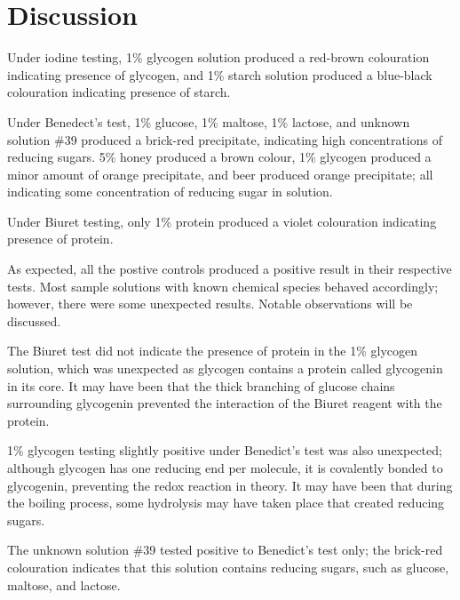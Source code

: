 \section*{Discussion}

Under iodine testing, 1\% glycogen solution produced a red-brown colouration indicating presence of glycogen, and 1\% starch solution produced a blue-black colouration indicating presence of starch.

Under Benedect's test, 1\% glucose, 1\% maltose, 1\% lactose, and unknown solution \#39 produced a brick-red precipitate, indicating high concentrations of reducing sugars. 5\% honey produced a brown colour, 1\% glycogen produced a minor amount of orange precipitate, and beer produced orange precipitate; all indicating some concentration of reducing sugar in solution.

Under Biuret testing, only 1\% protein produced a violet colouration indicating presence of protein.

As expected, all the postive controls produced a positive result in their respective tests. Most sample solutions with known chemical species behaved accordingly; however, there were some unexpected results. Notable observations will be discussed.

The Biuret test did not indicate the presence of protein in the 1\% glycogen solution, which was unexpected as glycogen contains a protein called glycogenin in its core. It may have been that the thick branching of glucose chains surrounding glycogenin prevented the interaction of the Biuret reagent with the protein.

1\% glycogen testing slightly positive under Benedict's test was also unexpected; although glycogen has one reducing end per molecule, it is covalently bonded to glycogenin, preventing the redox reaction in theory. It may have been that during the boiling process, some hydrolysis may have taken place that created reducing sugars.

The unknown solution \#39 tested positive to Benedict's test only; the brick-red colouration indicates that this solution contains reducing sugars, such as glucose, maltose, and lactose.


